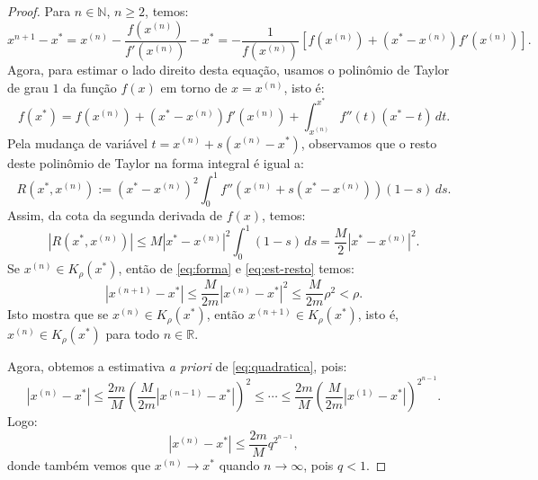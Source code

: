 \begin{proof}
  Para $n\in\mathbb{N}$, $n\geq 2$, temos:
  \begin{equation}\label{eq:forma}
    x^{n+1}-x^* = x^{(n)} - \frac{f(x^{(n)})}{f'(x^{(n)})} - x^* = -\frac{1}{f(x^{(n)})}\left[f(x^{(n)})+(x^*-x^{(n)})f'(x^{(n)})\right].
  \end{equation}
Agora, para estimar o lado direito desta equação, usamos o polinômio de Taylor de grau $1$ da função $f(x)$ em torno de $x = x^{(n)}$, isto é:
\begin{equation}
  f(x^*) = f(x^{(n)}) + (x^* - x^{(n)})f'(x^{(n)}) + \int_{x^{(n)}}^{x^*} f''(t)(x^* - t)\,dt.
\end{equation}
Pela mudança de variável $t = x^{(n)} + s(x^{(n)} - x^*)$, observamos que o resto deste polinômio de Taylor na forma integral é igual a:
\begin{equation}
  R(x^*,x^{(n)}) := (x^* - x^{(n)})^2\int_0^1 f''\left(x^{(n)} + s(x^* - x^{(n)})\right)(1-s)\,ds.
\end{equation}
Assim, da cota da segunda derivada de $f(x)$, temos:
\begin{equation}\label{eq:est-resto}
  |R(x^*,x^{(n)})| \leq M|x^*-x^{(n)}|^2\int_0^1 (1-s)\,ds = \frac{M}{2}|x^* - x^{(n)}|^2.
\end{equation}\label{eq:quadratica}
Se $x^{(n)}\in K_\rho(x^*)$, então de \eqref{eq:forma} e \eqref{eq:est-resto} temos:
\begin{equation}
  |x^{(n+1)} - x^*| \leq \frac{M}{2m}|x^{(n)} - x^*|^2 \leq \frac{M}{2m}\rho^2 < \rho.
\end{equation}
Isto mostra que se $x^{(n)}\in K_\rho(x^*)$, então $x^{(n+1)}\in K_\rho(x^*)$, isto é, $x^{(n)}\in K_\rho(x^*)$ para todo $n\in\mathbb{R}$.

Agora, obtemos a estimativa \emph{a priori} de \eqref{eq:quadratica}, pois:
\begin{equation}
  |x^{(n)} - x^*| \leq \frac{2m}{M}\left(\frac{M}{2m}|x^{(n-1)}-x^*|\right)^2 \leq \cdots \leq \frac{2m}{M}\left(\frac{M}{2m} |x^{(1)}-x^*|\right)^{2^{n-1}}.
\end{equation}
Logo:
\begin{equation}
  |x^{(n)} - x^*| \leq \frac{2m}{M}q^{2^{n-1}},
\end{equation}
donde também vemos que $x^{(n)}\to x^*$ quando $n\to\infty$, pois $q < 1$.


\end{proof}
